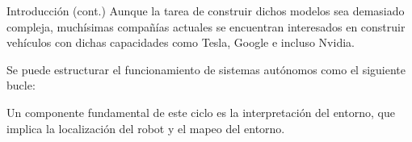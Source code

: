 \documentclass[10pt]{beamer}
\begin{document}
        \begin{frame}{Introducción (cont.)}
            Aunque la tarea de construir dichos modelos sea demasiado compleja, muchísimas compañías actuales se encuentran interesados en construir vehículos con dichas capacidades como Tesla, Google e incluso Nvidia.

            Se puede estructurar el funcionamiento de sistemas autónomos como el siguiente bucle:

            \begin{center}
            \end{center}
            
            Un componente fundamental de este ciclo es la interpretación del entorno, que implica la localización del robot y el mapeo del entorno.
        \end{frame}
        
\end{document}
